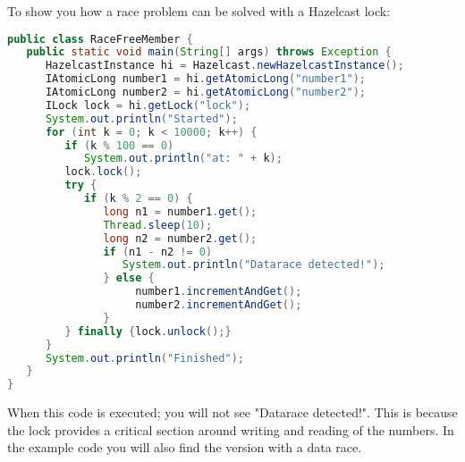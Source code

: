 To show you how a race problem can be solved with a Hazelcast lock:
\begin{lstlisting}[language=java]
public class RaceFreeMember {
   public static void main(String[] args) throws Exception {
      HazelcastInstance hi = Hazelcast.newHazelcastInstance();
      IAtomicLong number1 = hi.getAtomicLong("number1");
      IAtomicLong number2 = hi.getAtomicLong("number2");
      ILock lock = hi.getLock("lock");
      System.out.println("Started");
      for (int k = 0; k < 10000; k++) {
         if (k % 100 == 0) 
            System.out.println("at: " + k);
         lock.lock();
         try {
            if (k % 2 == 0) {
               long n1 = number1.get();
               Thread.sleep(10);
               long n2 = number2.get();
               if (n1 - n2 != 0) 
                  System.out.println("Datarace detected!");
               } else {
                    number1.incrementAndGet();
                    number2.incrementAndGet();
               }
         } finally {lock.unlock();}
      }
      System.out.println("Finished");
   }
}
\end{lstlisting}
When this code is executed; you will not see "Datarace detected!". This is because the lock provides a critical section around writing and reading of the numbers. In the example code you will also find the version with a data race.

